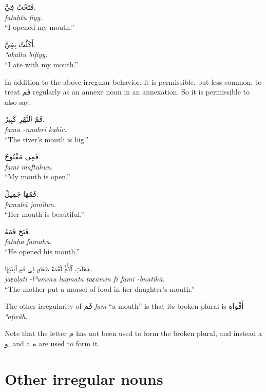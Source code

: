 \documentclass[
  10pt,
]{book}
\begin{document}
\foreignlanguage{arabic}{فَتَحْتُ فِيَّ.}\\
\emph{fataḥtu fiyy.}\\
\enquote{I opened my mouth.}

\foreignlanguage{arabic}{أَکَلْتُ بِفِيَّ.}\\
\emph{ʾakaltu bifiyy.}\\
\enquote{I ate with my mouth.}

In addition to the above irregular behavior, it is permissible, but less common, to treat \foreignlanguage{arabic}{فَم} regularly as an annexe noun in an annexation. So it is permissible to also say:

\foreignlanguage{arabic}{فَمُ ٱلنَّهْرِ کَبِيرٌ.}\\
\emph{famu -nnahri kabīr.}\\
\enquote{The river's mouth is big.}

\foreignlanguage{arabic}{فَمِي مَفْتُوحٌ.}\\
\emph{famī maftūhun.}\\
\enquote{My mouth is open.}

\foreignlanguage{arabic}{فَمُهَا جَمِيلٌ.}\\
\emph{famuhā jamīlun.}\\
\enquote{Her mouth is beautiful.}

\foreignlanguage{arabic}{فَتَحَ فَمَهُ.}\\
\emph{fataḥa famahu.}\\
\enquote{He opened his mouth.}

\foreignlanguage{arabic}{جَعَلَتِ ٱلْأُمُّ لُقْمَةَ طَعَامٍ فِي فَمِ ٱبْنَتِهَا.}\\
\emph{jaɛalati -lʾummu luqmata ṭaɛāmin fī fami -bnatihā.}\\
\enquote{The mother put a morsel of food in her daughter's mouth.}

The other irregularity of \foreignlanguage{arabic}{فَم} \emph{fam} \enquote{a mouth} is that its broken plural is
\foreignlanguage{arabic}{أَفْواه} \emph{ʾafwāh}.

Note that the letter \foreignlanguage{arabic}{م} has not been used to form the broken plural, and instead a \foreignlanguage{arabic}{و}, and a \foreignlanguage{arabic}{ه} are used to form it.

\section{Other irregular nouns}\label{other-irregular-nouns}
\end{document}
